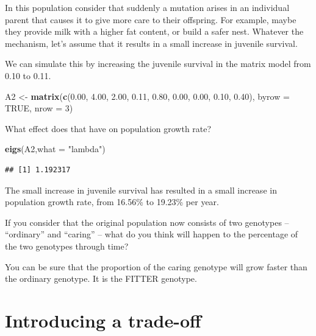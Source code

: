 \documentclass[
  a4paper]{book}
\newenvironment{Shaded}{\begin{snugshade}}{\end{snugshade}}
\newcommand{\AttributeTok}[1]{\textcolor[rgb]{0.13,0.29,0.53}{#1}}
\newcommand{\ConstantTok}[1]{\textcolor[rgb]{0.56,0.35,0.01}{#1}}
\newcommand{\DecValTok}[1]{\textcolor[rgb]{0.00,0.00,0.81}{#1}}
\newcommand{\FloatTok}[1]{\textcolor[rgb]{0.00,0.00,0.81}{#1}}
\newcommand{\FunctionTok}[1]{\textcolor[rgb]{0.13,0.29,0.53}{\textbf{#1}}}
\newcommand{\NormalTok}[1]{#1}
\newcommand{\OtherTok}[1]{\textcolor[rgb]{0.56,0.35,0.01}{#1}}
\newcommand{\StringTok}[1]{\textcolor[rgb]{0.31,0.60,0.02}{#1}}
\begin{document}
In this population consider that suddenly a mutation arises in an individual parent that causes it to give more care to their offspring. For example, maybe they provide milk with a higher fat content, or build a safer nest. Whatever the mechanism, let's assume that it results in a small increase in juvenile survival.

We can simulate this by increasing the juvenile survival in the matrix model from 0.10 to 0.11.

\begin{Shaded}
\begin{Highlighting}[]
\NormalTok{A2 }\OtherTok{\textless{}{-}} \FunctionTok{matrix}\NormalTok{(}\FunctionTok{c}\NormalTok{(}\FloatTok{0.00}\NormalTok{, }\FloatTok{4.00}\NormalTok{, }\FloatTok{2.00}\NormalTok{, }
               \FloatTok{0.11}\NormalTok{, }\FloatTok{0.80}\NormalTok{, }\FloatTok{0.00}\NormalTok{, }
               \FloatTok{0.00}\NormalTok{, }\FloatTok{0.10}\NormalTok{, }\FloatTok{0.40}\NormalTok{), }
            \AttributeTok{byrow =} \ConstantTok{TRUE}\NormalTok{, }\AttributeTok{nrow =} \DecValTok{3}\NormalTok{)}
\end{Highlighting}
\end{Shaded}

What effect does that have on population growth rate?

\begin{Shaded}
\begin{Highlighting}[]
\FunctionTok{eigs}\NormalTok{(A2,}\AttributeTok{what =} \StringTok{"lambda"}\NormalTok{)}
\end{Highlighting}
\end{Shaded}

\begin{verbatim}
## [1] 1.192317
\end{verbatim}

The small increase in juvenile survival has resulted in a small increase in population growth rate, from 16.56\% to 19.23\% per year.

If you consider that the original population now consists of two genotypes -- ``ordinary'' and ``caring'' -- what do you think will happen to the percentage of the two genotypes through time?

You can be sure that the proportion of the caring genotype will grow faster than the ordinary genotype. It is the FITTER genotype.

\section{Introducing a trade-off}\label{introducing-a-trade-off}
\end{document}
